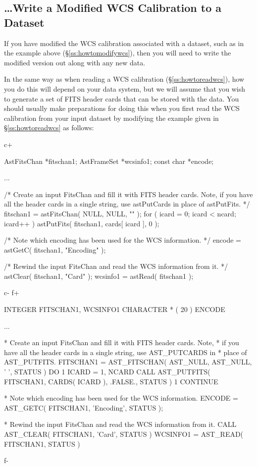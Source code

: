 \documentclass[twoside,11pt]{starlink}
\providecommand{\secref}[1]{\S\ref{#1}}
\begin{document}
\subsection{\label{ss:howtowritewcs}\ldots Write a Modified WCS Calibration to a Dataset}

If you have modified the WCS calibration associated with a dataset,
such as in the example above (\secref{ss:howtomodifywcs}), then you
will need to write the modified version out along with any new data.

In the same way as when reading a WCS calibration
(\secref{ss:howtoreadwcs}), how you do this will depend on your data
system, but we will assume that you wish to generate a set of FITS
header cards that can be stored with the data. You should usually make
preparations for doing this when you first read the WCS calibration
from your input dataset by modifying the example given in
\secref{ss:howtoreadwcs} as follows:

c+
\begin{small}
\begin{terminalv}
AstFitsChan *fitschan1;
AstFrameSet *wcsinfo1;
const char *encode;

...

/* Create an input FitsChan and fill it with FITS header cards. Note,
   if you have all the header cards in a single string, use astPutCards in
   place of astPutFits. */
fitschan1 = astFitsChan( NULL, NULL, "" );
for ( icard = 0; icard < ncard; icard++ ) astPutFits( fitschan1, cards[ icard ], 0 );

/* Note which encoding has been used for the WCS information. */
encode = astGetC( fitschan1, "Encoding" );

/* Rewind the input FitsChan and read the WCS information from it. */
astClear( fitschan1, "Card" );
wcsinfo1 = astRead( fitschan1 );
\end{terminalv}
\end{small}
c-
f+
\begin{small}
\begin{terminalv}
      INTEGER FITSCHAN1, WCSINFO1
      CHARACTER * ( 20 ) ENCODE

      ...

*  Create an input FitsChan and fill it with FITS header cards. Note,
*  if you have all the header cards in a single string, use AST_PUTCARDS in
*  place of AST_PUTFITS.
      FITSCHAN1 = AST_FITSCHAN( AST_NULL, AST_NULL, ' ', STATUS )
      DO 1 ICARD = 1, NCARD
         CALL AST_PUTFITS( FITSCHAN1, CARDS( ICARD ), .FALSE., STATUS )
 1    CONTINUE

*  Note which encoding has been used for the WCS information.
      ENCODE = AST_GETC( FITSCHAN1, 'Encoding', STATUS );

*  Rewind the input FitsChan and read the WCS information from it.
      CALL AST_CLEAR( FITSCHAN1, 'Card', STATUS )
      WCSINFO1 = AST_READ( FITSCHAN1, STATUS )
\end{terminalv}
\end{small}
f-
\end{document}

